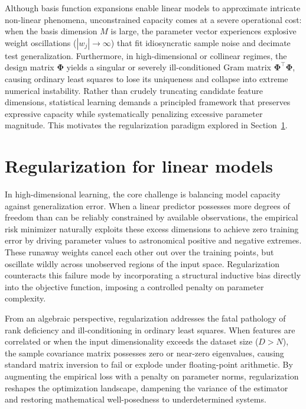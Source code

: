 Although basis function expansions enable linear models to approximate intricate non-linear phenomena, unconstrained capacity comes at a severe operational cost: when the basis dimension $M$ is large, the parameter vector experiences explosive weight oscillations ($|w_j| \to \infty$) that fit idiosyncratic sample noise and decimate test generalization. Furthermore, in high-dimensional or collinear regimes, the design matrix $\boldsymbol{\Phi}$ yields a singular or severely ill-conditioned Gram matrix $\boldsymbol{\Phi}^\top \boldsymbol{\Phi}$, causing ordinary least squares to lose its uniqueness and collapse into extreme numerical instability. Rather than crudely truncating candidate feature dimensions, statistical learning demands a principled framework that preserves expressive capacity while systematically penalizing excessive parameter magnitude. This motivates the regularization paradigm explored in Section~\ref{sec:regularization_linear_models}.

\section{Regularization for linear models}
\label{sec:regularization_linear_models}

In high-dimensional learning, the core challenge is balancing model capacity against generalization error. When a linear predictor possesses more degrees of freedom than can be reliably constrained by available observations, the empirical risk minimizer naturally exploits these excess dimensions to achieve zero training error by driving parameter values to astronomical positive and negative extremes. These runaway weights cancel each other out over the training points, but oscillate wildly across unobserved regions of the input space. Regularization counteracts this failure mode by incorporating a structural inductive bias directly into the objective function, imposing a controlled penalty on parameter complexity.

From an algebraic perspective, regularization addresses the fatal pathology of rank deficiency and ill-conditioning in ordinary least squares. When features are correlated or when the input dimensionality exceeds the dataset size ($D > N$), the sample covariance matrix possesses zero or near-zero eigenvalues, causing standard matrix inversion to fail or explode under floating-point arithmetic. By augmenting the empirical loss with a penalty on parameter norms, regularization reshapes the optimization landscape, dampening the variance of the estimator and restoring mathematical well-posedness to underdetermined systems.

